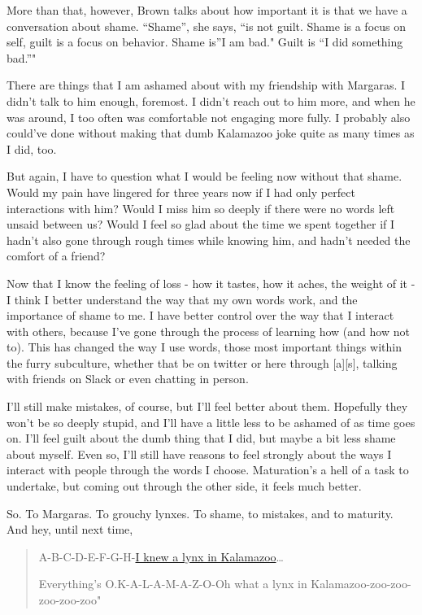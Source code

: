 More than that, however, Brown talks about how important it is that we
have a conversation about shame. ``Shame'', she says, ``is not guilt.
Shame is a focus on self, guilt is a focus on behavior. Shame is''I am
bad." Guilt is ``I did something bad.''"

There are things that I am ashamed about with my friendship with
Margaras. I didn't talk to him enough, foremost. I didn't reach out to
him more, and when he was around, I too often was comfortable not
engaging more fully. I probably also could've done without making that
dumb Kalamazoo joke quite as many times as I did, too.

But again, I have to question what I would be feeling now without that
shame. Would my pain have lingered for three years now if I had only
perfect interactions with him? Would I miss him so deeply if there were
no words left unsaid between us? Would I feel so glad about the time we
spent together if I hadn't also gone through rough times while knowing
him, and hadn't needed the comfort of a friend?

Now that I know the feeling of loss - how it tastes, how it aches, the
weight of it - I think I better understand the way that my own words
work, and the importance of shame to me. I have better control over the
way that I interact with others, because I've gone through the process
of learning how (and how not to). This has changed the way I use words,
those most important things within the furry subculture, whether that be
on twitter or here through {[}a{]}{[}s{]}, talking with friends on Slack
or even chatting in person.

I'll still make mistakes, of course, but I'll feel better about them.
Hopefully they won't be so deeply stupid, and I'll have a little less to
be ashamed of as time goes on. I'll feel guilt about the dumb thing that
I did, but maybe a bit less shame about myself. Even so, I'll still have
reasons to feel strongly about the ways I interact with people through
the words I choose. Maturation's a hell of a task to undertake, but
coming out through the other side, it feels much better.

So. To Margaras. To grouchy lynxes. To shame, to mistakes, and to
maturity. And hey, until next time,

\begin{quote}
A-B-C-D-E-F-G-H-\href{https://www.youtube.com/watch?v=WQQfK8Bqkw0}{I
knew a lynx in Kalamazoo}\ldots{}

Everything's O.K-A-L-A-M-A-Z-O-Oh what a lynx in
Kalamazoo-zoo-zoo-zoo-zoo-zoo"
\end{quote}
